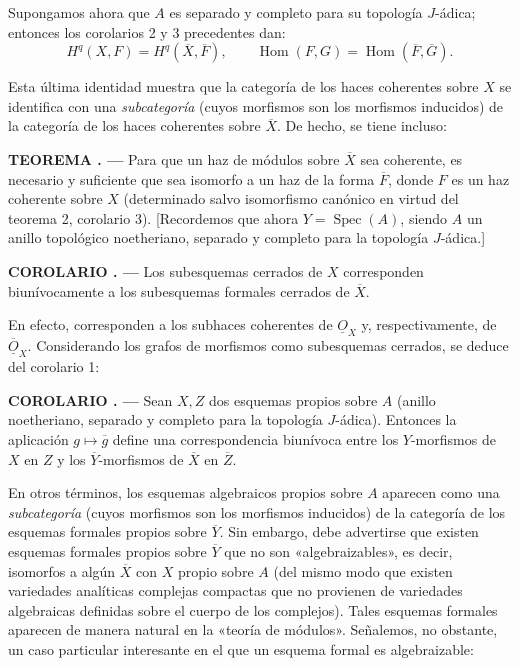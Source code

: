 \documentclass[11pt,twoside,openany]{book}
\numberwithin{equation}{section}
\newcommand{\src}[1]{%
  \phantomsection\hypertarget{src:#1}{}%
  \marginpar{\raggedleft\footnotesize\sffamily #1}%
}
\newcommand{\Osh}{\underline{O}}
\theoremstyle{plain}
\theoremstyle{definition}
\theoremstyle{remark}
\newcommand{\result}[2]{%
  \par\medskip\noindent\textbf{#1%
  \if\relax\detokenize{#2}\relax\else\space#2\fi. ---}\enspace
}
\newcommand{\FgaUnitKey}{frontmatter}
\renewcommand{\src}[1]{%
  \phantomsection\hypertarget{src:\FgaUnitKey:#1}{}%
  \marginpar{\raggedleft\footnotesize\sffamily #1}%
}
\theoremstyle{plain}
\theoremstyle{definition}
\theoremstyle{remark}
\begin{document}
Supongamos ahora que $A$ es separado y completo para su topología $J$-ádica;
entonces los corolarios 2 y 3 precedentes dan:
\[
  H^{q}(X,F)=H^{q}(\overline X,\overline F),
  \qquad
  \operatorname{Hom}(F,G)
  =\operatorname{Hom}(\overline F,\overline G).
\]

\src{198}
Esta última identidad muestra que la categoría de los haces coherentes sobre
$X$ se identifica con una \emph{subcategoría} (cuyos morfismos son los
morfismos inducidos) de la categoría de los haces coherentes sobre
$\overline X$. De hecho, se tiene incluso:

\result{TEOREMA}{3} Para que un haz de módulos sobre $\overline X$ sea
coherente, es necesario y suficiente que sea isomorfo a un haz de la forma
$\overline F$, donde $F$ es un haz coherente sobre $X$ (determinado salvo
isomorfismo canónico en virtud del teorema 2, corolario 3). [Recordemos que
ahora $Y=\operatorname{Spec}(A)$, siendo $A$ un anillo topológico noetheriano,
separado y completo para la topología $J$-ádica.]

\result{COROLARIO}{1} Los subesquemas cerrados de $X$ corresponden
biunívocamente a los subesquemas formales cerrados de $\overline X$.

En efecto, corresponden a los subhaces coherentes de $\Osh_X$ y,
respectivamente, de $\overline{\Osh}_X$. Considerando los grafos de morfismos
como subesquemas cerrados, se deduce del corolario 1:

\result{COROLARIO}{2} Sean $X,Z$ dos esquemas propios sobre $A$ (anillo
noetheriano, separado y completo para la topología $J$-ádica). Entonces la
aplicación $g\longmapsto\overline g$ define una correspondencia biunívoca entre
los $Y$-morfismos de $X$ en $Z$ y los $\overline Y$-morfismos de $\overline X$
en $\overline Z$.

En otros términos, los esquemas algebraicos propios sobre $A$ aparecen como una
\emph{subcategoría} (cuyos morfismos son los morfismos inducidos) de la
categoría de los esquemas formales propios sobre $\overline Y$. Sin embargo,
debe advertirse que existen esquemas formales propios sobre $\overline Y$ que
no son «algebraizables», es decir, isomorfos a algún $\overline X$ con $X$
propio sobre $A$ (del mismo modo que existen variedades analíticas complejas
compactas que no provienen de variedades algebraicas definidas sobre el cuerpo
de los complejos). Tales esquemas formales aparecen de manera natural en la
«teoría de módulos». Señalemos, no obstante, un caso particular interesante en
el que un esquema formal es algebraizable:
\end{document}
